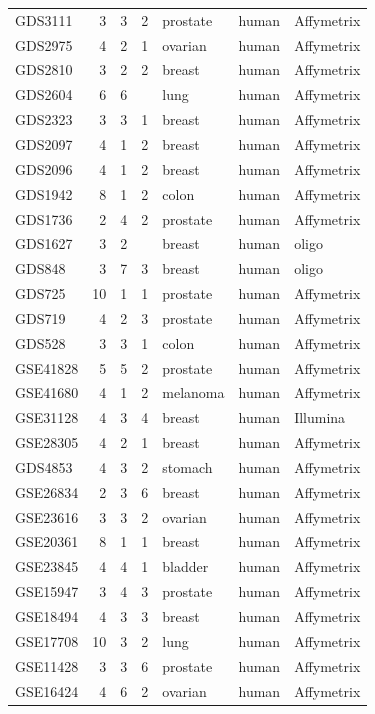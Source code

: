 \begin{table}
{\begin{tabular}{lrrrlll}
GDS3111	&	3	&	3	&	2	&	prostate	&	human	&	Affymetrix	\\
GDS2975	&	4	&	2	&	1	&	ovarian	&	human	&	Affymetrix	\\
GDS2810	&	3	&	2	&	2	&	breast	&	human	&	Affymetrix	\\
GDS2604	&	6	&	6	&		&	lung	&	human 	&	Affymetrix	\\
GDS2323	&	3	&	3	&	1	&	breast	&	human 	&	Affymetrix	\\
GDS2097	&	4	&	1	&	2	&	breast	&	human 	&	Affymetrix	\\
GDS2096	&	4	&	1	&	2	&	breast	&	human 	&	Affymetrix	\\
GDS1942	&	8	&	1	&	2	&	colon	&	human	&	Affymetrix	\\
GDS1736	&	2	&	4	&	2	&	prostate	&	human	&	Affymetrix	\\
GDS1627	&	3	&	2	&		&	breast	&	human	&	oligo	\\
GDS848	&	3	&	7	&	3	&	breast	&	human	&	oligo	\\
GDS725	&	10	&	1	&	1	&	prostate	&	human	&	Affymetrix	\\
GDS719	&	4	&	2	&	3	&	prostate	&	human	&	Affymetrix	\\
GDS528	&	3	&	3	&	1	&	colon	&	human	&	Affymetrix	\\
GSE41828	&	5	&	5	&	2	&	prostate	&	human	&	Affymetrix	\\
GSE41680	&	4	&	1	&	2	&	melanoma	&	human	&	Affymetrix	\\
GSE31128	&	4	&	3	&	4	&	breast	&	human 	&	Illumina	\\
GSE28305	&	4	&	2	&	1	&	breast	&	human	&	Affymetrix	\\
GDS4853	&	4	&	3	&	2	&	stomach	&	human	&	Affymetrix	\\
GSE26834	&	2	&	3	&	6	&	breast	&	human	&	Affymetrix	\\
GSE23616	&	3	&	3	&	2	&	ovarian	&	human	&	Affymetrix	\\
GSE20361	&	8	&	1	&	1	&	breast	&	human	&	Affymetrix	\\
GSE23845	&	4	&	4	&	1	&	bladder	&	human	&	Affymetrix	\\
GSE15947	&	3	&	4	&	3	&	prostate	&	human	&	Affymetrix	\\
GSE18494	&	4	&	3	&	3	&	breast	&	human	&	Affymetrix	\\
GSE17708	&	10	&	3	&	2	&	lung	&	human	&	Affymetrix	\\
GSE11428	&	3	&	3	&	6	&	prostate	&	human	&	Affymetrix	\\
GSE16424	&	4	&	6	&	2	&	ovarian	&	human	&	Affymetrix	\\

\end{tabular}}
\end{table}
